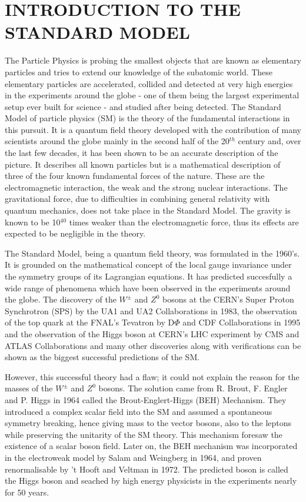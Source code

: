 \chapter{INTRODUCTION TO THE STANDARD MODEL}\label{Ch1}

The Particle Physics is probing the smallest objects that are known as elementary particles and tries to extend our knowledge of the subatomic world. These elementary particles are accelerated, collided and detected at very high energies in the experiments around the globe - one of them being the largest experimental setup ever built for science - and studied after being detected. The Standard Model of particle physics (SM) is the theory of the fundamental interactions in this pursuit. It is a quantum field theory developed with the contribution of many scientists around the globe mainly in the second half of the 20$^{th}$ century and, over the last few decades, it has been shown to be an accurate description of the picture. It describes all known particles but is a mathematical description of three of the four known fundamental forces of the nature. These are the electromagnetic interaction, the weak and the strong nuclear interactions. The gravitational force, due to difficulties in combining general relativity with quantum mechanics, does not take place in the Standard Model. The gravity is known to be 10$^{40}$ times weaker than the electromagnetic force, thus its effects are expected to be negligible in the theory.

The Standard Model, being a quantum field theory, was formulated in the 1960's. It is grounded on the mathematical concept of the local gauge invariance under the symmetry groups of its Lagrangian equations. It has predicted succesfully a wide range of phenomena which have been observed in the experiments around the globe. The discovery of the $W^\pm$ and $Z^0$ bosons \cite{SPS-1, SPS-2, SPS-3, SPS-4, SPS-5} at the CERN's Super Proton Synchrotron (SPS) by the UA1 and UA2 Collaborations in 1983, the observation of the top quark at the FNAL's Tevatron by D$\Phi$ and CDF Collaborations\cite{fnal-1, fnal-2} in 1995 and the observation of the Higgs boson at CERN's LHC experiment\cite{HiggsCMS,HiggsATLAS} by CMS and ATLAS Collaborations and many other discoveries along with verifications can be shown as the biggest successful predictions of the SM.

However, this successful theory had a flaw; it could not explain the reason for the masses of the $W^\pm$ and $Z^0$ bosons. The solution came from R. Brout, F. Engler and P. Higgs in 1964 called the Brout-Englert-Higgs (BEH) Mechanism\cite{Higgs1964, BroutEnglert, Guralnik1964}. They introduced a complex scalar field into the SM and assumed a spontaneous symmetry breaking, hence giving mass to the vector bosons, also to the leptons while preserving the unitarity of the SM theory. This mechanism foresaw the existence of a scalar boson field. Later on, the BEH mechanism was incorporated in the electroweak model by Salam and Weingberg\cite{salam} in 1964, and proven renormalisable by 't Hooft and Veltman in 1972\cite{thooft}. The predicted boson is called the Higgs boson and seached by high energy physicists in the experiments nearly for 50 years.

